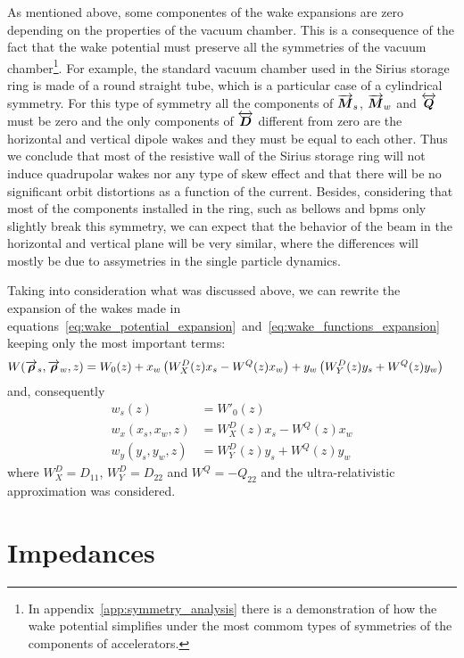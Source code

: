 \documentclass[
	12pt,				%
	openright,			%
	oneside,			%
	a4paper,		%
	chapter=TITLE,		%
	section=TITLE,		%
    brazil,				%
	english,			%
	sumario=tradicional,
	]{abntex2}
\begin{document}
  As mentioned above, some componentes of the wake expansions are zero depending on the properties of the vacuum chamber. This is a consequence of the fact that the wake potential must preserve all the symmetries of the vacuum chamber\footnote{In appendix~\ref{app:symmetry_analysis} there is a demonstration of how the wake potential simplifies under the most commom types of symmetries of the components of accelerators.}. For example, the standard vacuum chamber used in the Sirius storage ring is made of a round straight tube, which is a particular case of a cylindrical symmetry. For this type of symmetry all the components of $\overrightarrow{\boldsymbol{M}}_s$, $\overrightarrow{\boldsymbol{M}}_w$ and $\overleftrightarrow{\boldsymbol{Q}}$ must be zero and the only components of $\overleftrightarrow{\boldsymbol{D}}$ different from zero are the horizontal and vertical dipole wakes and they must be equal to each other. Thus we conclude that most of the resistive wall of the Sirius storage ring will not induce quadrupolar wakes nor any type of skew effect and that there will be no significant orbit distortions as a function of the current. Besides, considering that most of the components installed in the ring, such as bellows and \gls{bpms} only slightly break this symmetry, we can expect that the behavior of the beam in the horizontal and vertical plane will be very similar, where the differences will mostly be due to assymetries in the single particle dynamics.

  Taking into consideration what was discussed above, we can rewrite the expansion of the wakes made in equations~\eqref{eq:wake_potential_expansion}~and~\eqref{eq:wake_functions_expansion} keeping only the most important terms:
  \begin{align}
  	  W(\overrightarrow{\boldsymbol{\rho}}_s, \overrightarrow{\boldsymbol{\rho}}_w, z) &=
	  	W_0(z) +
		x_w\left(W^D_X(z)x_s - W^Q(z)x_w\right) +
		y_w\left(W^D_Y(z)y_s + W^Q(z)y_w\right)
  \end{align}
  and, consequently
  \begin{align}\nonumber
  	w_s(z) &= W'_0(z) \\
	w_x(x_s, x_w, z) &= W^D_X(z)x_s - W^Q(z)x_w \\\nonumber
	w_y(y_s, y_w, z) &= W^D_Y(z)y_s + W^Q(z)y_w
  \end{align}
  where $W^D_X = D_{11}$, $W^D_Y = D_{22}$ and $W^Q = -Q_{22}$ and the ultra-relativistic approximation was considered.

  \section{Impedances}\label{sec:wake_functions}
\end{document}

